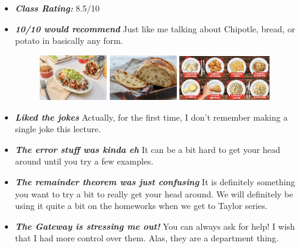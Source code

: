 \documentclass[11pt,letterpaper]{article}
\begin{document}
\begin{itemize}
\item {\bfseries\itshape Class Rating:} 8.5/10

\item {\bfseries\itshape 10/10 would recommend} Just like me talking about Chipotle, bread, or potato in basically any form.
	\begin{figure}[H]
	\centering
	\includegraphics[width=0.275\textwidth]{images/chtle.png}
	\includegraphics[width=0.275\textwidth]{images/bread.jpeg}
	\includegraphics[width=0.37\textwidth]{images/potato}
	\end{figure}	

\item {\bfseries\itshape Liked the jokes} Actually, for the first time, I don't remember making a single joke this lecture. 

\item {\bfseries\itshape The error stuff was kinda eh} It can be a bit hard to get your head around until you try a few examples.

\item {\bfseries\itshape The remainder theorem was just confusing} It is definitely something you want to try a bit to really get your head around. We will definitely be using it quite a bit on the homeworks when we get to Taylor series.

\item {\bfseries\itshape The Gateway is stressing me out!} You can always ask for help! I wish that I had more control over them. Alas, they are a department thing. 
\end{itemize}

\newpage
\end{document}
